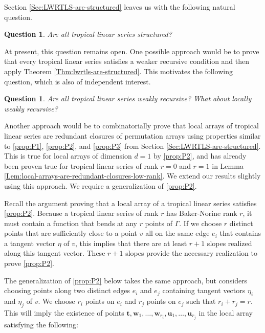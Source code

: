 \documentclass{amsart}
\newtheorem{question}[theorem]{Question}
\begin{document}
	Section \ref{Sec:LWRTLS-are-structured} leaves us with the following natural question.
	
	\begin{question}
		\label{Quest:tls-all-structured}
		Are all tropical linear series structured?
	\end{question}
	
	At present, this question remains open. One possible approach would be to prove that every tropical linear series satisfies a weaker recursive condition and then apply Theorem \ref{Thm:lwrtls-are-structured}. This motivates the following question, which is also of independent interest.
	
	\begin{question}
		\label{Quest:tls-are-locally-weakly-recursive}
		Are all tropical linear series weakly recursive? What about locally weakly recursive?
	\end{question}
	
	Another approach would be to combinatorially prove that local arrays of tropical linear series are redundant closures of permutation arrays using properties similar to \ref{prop:P1}, \ref{prop:P2}, and \ref{prop:P3} from Section \ref{Sec:LWRTLS-are-structured}. This is true for local arrays of dimension $d=1$ by \ref{prop:P2}, and has already been proven true for tropical linear series of rank $r=0$ and $r=1$ in Lemma \ref{Lem:local-arrays-are-redundant-closures-low-rank}. We extend our results slightly using this approach. We require a generalization of \ref{prop:P2}. 
	
	Recall the argument proving that a local array of a tropical linear series satisfies \ref{prop:P2}. Because a tropical linear series of rank $r$ has Baker-Norine rank $r$, it must contain a function that bends at any $r$ points of $\Gamma$. If we choose $r$ distinct points that are sufficiently close to a point $v$ all on the same edge $e_i$ that contains a tangent vector $\eta$ of $v$, this implies that there are at least $r+1$ slopes realized along this tangent vector. These $r+1$ slopes provide the necessary realization to prove \ref{prop:P2}. 
	
	The generalization of \ref{prop:P2} below takes the same approach, but considers choosing points along two distinct edges $e_i$ and $e_j$ containing tangent vectors $\eta_i$ and $\eta_j$ of $v$. We choose $r_i$ points on $e_i$ and $r_j$ points on $e_j$ such that $r_i + r_j = r$. This will imply the existence of points $\mathbf{t}, \mathbf{w}_1, \ldots, \mathbf{w}_{r_i}, \mathbf{u}_1, \ldots, \mathbf{u}_{r_j}$ in the local array satisfying the following: 
	
\end{document}
